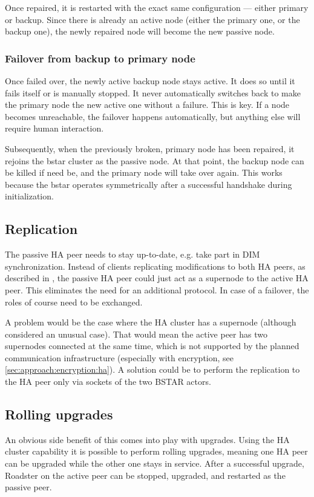 Once repaired, it is restarted with the exact same configuration --- either primary
or backup. Since there is already an active node (either the primary one,
or the backup one), the newly repaired node will become the new passive node.

\subsubsection{Failover from backup to primary node}
Once failed over, the newly active backup node stays active. It does so until it
fails itself or is manually stopped. It never automatically switches back to
make the primary node the new active one without a failure. This is key. If a
node becomes unreachable, the failover happens automatically, but anything else will
require human interaction.

Subsequently, when the previously broken, primary node has been repaired, it
rejoins the \gls{bstar} cluster as the passive node. At that point, the backup
node can be killed if need be, and the primary node will take over again.  This
works because the \gls{bstar} operates symmetrically after a successful
handshake during initialization.

\subsection{Replication}
The passive HA peer needs to stay up-to-date, e.g. take part in DIM
synchronization. Instead of clients replicating modifications to both HA peers, as
described in \cite[Chapter 5 - Advanced Pub-Sub Patterns, The Clustered Hashmap
Protocol]{zmq:zguide}, the passive HA peer could just act as a supernode to the
active HA peer. This eliminates the need for an additional protocol. In case of
a failover, the roles of course need to be exchanged.

{\color{red}A problem would be the case where the HA cluster has a supernode (although
considered an unusual case). That would mean the active peer has two supernodes
connected at the same time, which is not supported by the planned communication
infrastructure (especially with encryption, see
\autoref{sec:approach:encryption:ha}).  A solution could be to perform the
replication to the HA peer only via sockets of the two BSTAR actors.}

\subsection{Rolling upgrades}
An obvious side benefit of this comes into play with upgrades. Using the HA
cluster capability it is possible to perform rolling upgrades, meaning one HA
peer can be upgraded while the other one stays in service. After a successful
upgrade, Roadster on the active peer can be stopped, upgraded, and restarted as
the passive peer.


